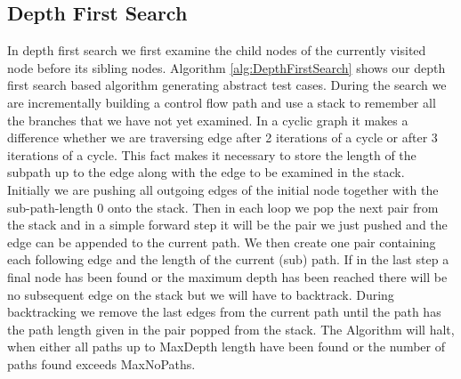 \subsection{Depth First Search}
In depth first search we first examine the child nodes of the currently visited node before its sibling nodes. Algorithm \ref{alg:DepthFirstSearch} shows our depth first search based algorithm generating abstract test cases. During the search we are incrementally building a control flow path and use a stack to remember all the branches that we have not yet examined. In a cyclic graph it makes a difference whether we are traversing edge after 2 iterations of a cycle or after 3 iterations of a cycle. This fact makes it necessary to store the length of the subpath up to the edge along with the edge to be examined in the stack.\\
Initially we are pushing all outgoing edges of the initial node together with the sub-path-length $0$ onto the stack. Then in each loop we pop the next pair from the stack and in a simple forward step it will be the pair we just pushed and the edge can be appended to the current path. We then create one pair containing each following edge and the length of the current (sub) path. If in the last step a final node has been found or the maximum depth has been reached there will be no subsequent edge on the stack but we will have to backtrack. During backtracking we remove the last edges from the current path until the path has the path length given in the pair popped from the stack. The Algorithm will halt, when either all paths up to MaxDepth length have been found or the number of paths found exceeds MaxNoPaths.
